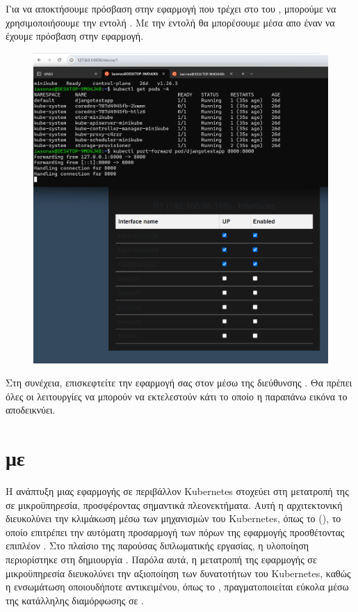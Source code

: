 Για να αποκτήσουμε πρόσβαση στην εφαρμογή  που τρέχει στο  του , 
μπορούμε να χρησιμοποιήσουμε την εντολή . Με την εντολή  θα μπορέσουμε μέσα απο έναν 
να έχουμε πρόσβαση στην εφαρμογή.

\FloatBarrier

\begin{figure}[h]
	\centering
	\includegraphics[width=1.5\textwidth]{graphics/kubernetes_proxy.png}
	\caption{}
\end{figure}

\FloatBarrier

\noindent  Στη συνέχεια, επισκεφτείτε την εφαρμογή σας στον  μέσω της διεύθυνσης . Θα πρέπει όλες οι λειτουργίες
να μπορούν να εκτελεστούν κάτι το οποίο η παραπάνω εικόνα το αποδεικνύει. 


\section{ με }

Η ανάπτυξη μιας εφαρμογής σε περιβάλλον Kubernetes στοχεύει στη μετατροπή της σε μικροϋπηρεσία, προσφέροντας σημαντικά πλεονεκτήματα. Αυτή η αρχιτεκτονική διευκολύνει την κλιμάκωση μέσω των μηχανισμών του Kubernetes, όπως το  (), το οποίο επιτρέπει την αυτόματη προσαρμογή των πόρων της εφαρμογής προσθέτοντας επιπλέον . Στο πλαίσιο της παρούσας διπλωματικής εργασίας, η υλοποίηση περιορίστηκε στη δημιουργία . Παρόλα αυτά, η μετατροπή της εφαρμογής σε μικροϋπηρεσία διευκολύνει την αξιοποίηση των δυνατοτήτων του Kubernetes, καθώς η ενσωμάτωση οποιουδήποτε αντικειμένου, όπως το , πραγματοποιείται εύκολα μέσω της κατάλληλης διαμόρφωσης σε .

